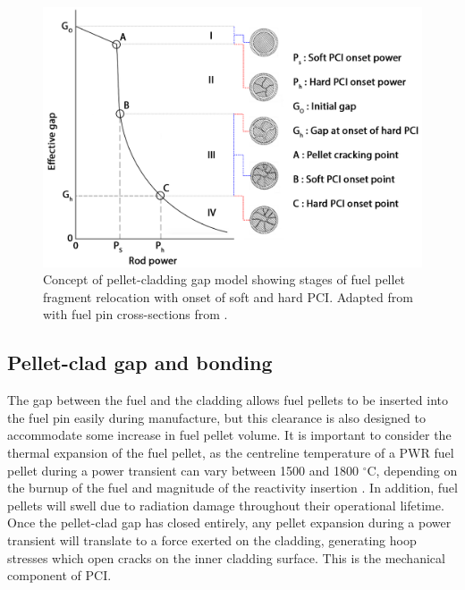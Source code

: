 \begin{figure}[ht] %
\centering
\includegraphics[width=15cm]{images/relocation.png}
\caption[Concept of pellet-cladding gap model showing stages of fuel pellet fragment relocation with onset of soft and hard PCI. ]{Concept of pellet-cladding gap model showing stages of fuel pellet fragment relocation with onset of soft and hard PCI. Adapted from \cite{Oguma1983} with fuel pin cross-sections from \cite{walton1983fuel}.}
\label{figure:relocation}
\end{figure}

\subsection{Pellet-clad gap and bonding}

The gap between the fuel and the cladding allows fuel pellets to be inserted into the fuel pin easily during manufacture, but this clearance is also designed to accommodate some increase in fuel pellet volume. It is important to consider the thermal expansion of the fuel pellet, as the centreline temperature of a PWR fuel pellet during a power transient can vary between 1500 and 1800 $^{\circ}$C, depending on the burnup of the fuel and magnitude of the reactivity insertion \cite{Bagger1994}. In addition, fuel pellets will swell due to radiation damage throughout their operational lifetime. Once the pellet-clad gap has closed entirely, any pellet expansion during a power transient will translate to a force exerted on the cladding, generating hoop stresses which open cracks on the inner cladding surface. This is the mechanical component of PCI.

